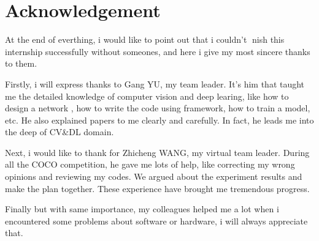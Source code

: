 \chapter{Acknowledgement}

At the end of everthing, i would like to point out that i couldn’t nish this internship
successfully without someones, and here i give my most sincere thanks to them.

Firstly, i will express thanks to Gang YU, my team leader. It’s him
that taught me the detailed knowledge of computer vision and deep learing, like how to design a network , how to write the code using framework, how to train a model, etc.
He also explained papers to me clearly and carefully.
In fact, he leads me into the deep of CV&DL domain.

Next, i would like to thank for Zhicheng WANG, my virtual team leader.
During all the COCO competition, he gave me lots of help, like correcting my wrong opinions and reviewing my codes.
We argued about the experiment results and make the plan together.
These experience have brought me tremendous progress.

Finally but with same importance, my colleagues helped me a lot when i encountered
some problems about software or hardware, i will always appreciate that.

